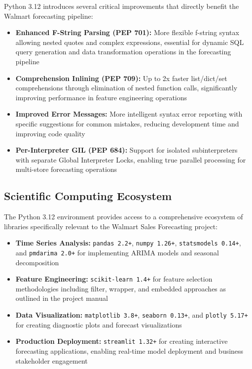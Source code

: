 Python 3.12 introduces several critical improvements that directly benefit the Walmart forecasting pipeline:

\begin{itemize}
	\item \textbf{Enhanced F-String Parsing (PEP 701):} More flexible f-string syntax allowing nested quotes and complex expressions, essential for dynamic SQL query generation and data transformation operations in the forecasting pipeline
	\item \textbf{Comprehension Inlining (PEP 709):} Up to 2x faster list/dict/set comprehensions through elimination of nested function calls, significantly improving performance in feature engineering operations
	\item \textbf{Improved Error Messages:} More intelligent syntax error reporting with specific suggestions for common mistakes, reducing development time and improving code quality
	\item \textbf{Per-Interpreter GIL (PEP 684):} Support for isolated subinterpreters with separate Global Interpreter Locks, enabling true parallel processing for multi-store forecasting operations
\end{itemize}

\subsection{Scientific Computing Ecosystem}

The Python 3.12 environment provides access to a comprehensive ecosystem of libraries specifically relevant to the Walmart Sales Forecasting project:

\begin{itemize}
	\item \textbf{Time Series Analysis:} \texttt{pandas 2.2+}, \texttt{numpy 1.26+}, \texttt{statsmodels 0.14+}, and \texttt{pmdarima 2.0+} for implementing ARIMA models and seasonal decomposition
	\item \textbf{Feature Engineering:} \texttt{scikit-learn 1.4+} for feature selection methodologies including filter, wrapper, and embedded approaches as outlined in the project manual \cite{Guyon:2003}
	\item \textbf{Data Visualization:} \texttt{matplotlib 3.8+}, \texttt{seaborn 0.13+}, and \texttt{plotly 5.17+} for creating diagnostic plots and forecast visualizations
	\item \textbf{Production Deployment:} \texttt{streamlit 1.32+} for creating interactive forecasting applications, enabling real-time model deployment and business stakeholder engagement
\end{itemize}

